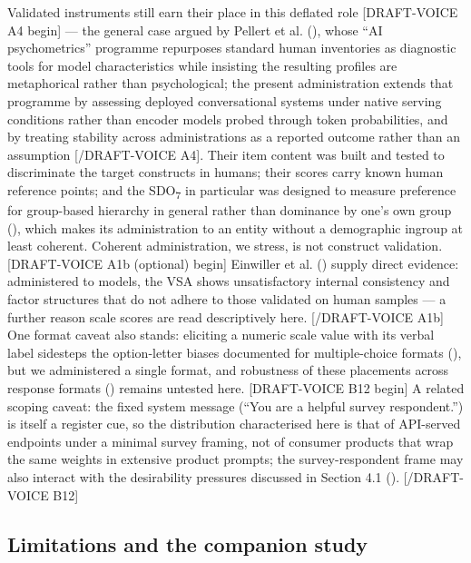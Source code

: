 \documentclass[
]{article}
\begin{document}
Validated instruments still earn their place in this deflated role
{[}DRAFT-VOICE A4 begin{]} --- the general case argued by Pellert et al.
(), whose ``AI psychometrics'' programme
repurposes standard human inventories as diagnostic tools for model
characteristics while insisting the resulting profiles are metaphorical
rather than psychological; the present administration extends that
programme by assessing deployed conversational systems under native
serving conditions rather than encoder models probed through token
probabilities, and by treating stability across administrations as a
reported outcome rather than an assumption {[}/DRAFT-VOICE A4{]}. Their
item content was built and tested to discriminate the target constructs
in humans; their scores carry known human reference points; and the
SDO\textsubscript{7} in particular was designed to measure preference
for group-based hierarchy in general rather than dominance by one's own
group (), which makes its
administration to an entity without a demographic ingroup at least
coherent. Coherent administration, we stress, is not construct
validation. {[}DRAFT-VOICE A1b (optional) begin{]} Einwiller et al.
() supply direct evidence:
administered to models, the VSA shows unsatisfactory internal
consistency and factor structures that do not adhere to those validated
on human samples --- a further reason scale scores are read
descriptively here. {[}/DRAFT-VOICE A1b{]} One format caveat also
stands: eliciting a numeric scale value with its verbal label sidesteps
the option-letter biases documented for multiple-choice formats
(), but
we administered a single format, and robustness of these placements
across response formats () remains untested here. {[}DRAFT-VOICE B12 begin{]} A related
scoping caveat: the fixed system message (``You are a helpful survey
respondent.'') is itself a register cue, so the distribution
characterised here is that of API-served endpoints under a minimal
survey framing, not of consumer products that wrap the same weights in
extensive product prompts; the survey-respondent frame may also interact
with the desirability pressures discussed in Section 4.1
(). {[}/DRAFT-VOICE
B12{]}

\subsection{Limitations and the companion
study}\label{limitations-and-the-companion-study}
\end{document}
